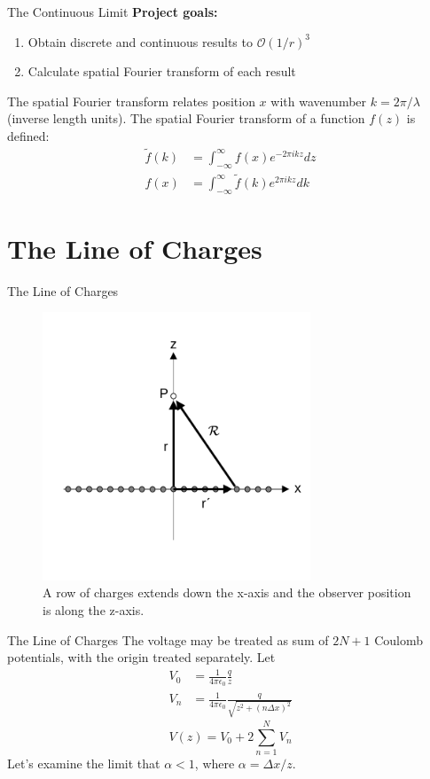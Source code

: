 \documentclass{beamer}
\begin{document}
\begin{frame}{The Continuous Limit}
\alert{\textbf{Project goals:}}
\begin{enumerate}
\item Obtain discrete and continuous results to $\mathcal{O}(1/r)^3$
\item Calculate spatial Fourier transform of each result
\end{enumerate}
The spatial Fourier transform relates position $x$ with wavenumber $k = 2\pi/\lambda$ (inverse length units). The spatial Fourier transform of a function $f(z)$ is defined:
\begin{align}
\widetilde{f}(k) &= \int_{-\infty}^{\infty} f(x) e^{-2\pi i k z} dz \\
f(x) &= \int_{-\infty}^{\infty} \widetilde{f}(k) e^{2\pi i k z} dk
\end{align}
\end{frame}

\section{The Line of Charges}

\begin{frame}{The Line of Charges}
\small
\begin{figure}
\centering
\includegraphics[width=8cm,trim=0cm 3cm 0cm 1cm,clip=true]{figures/line_of_charges.pdf}
\caption{\label{fig:line} A row of charges extends down the x-axis and the observer position is along the z-axis.}
\end{figure}
\end{frame}

\begin{frame}{The Line of Charges}
The voltage may be treated as sum of $2N + 1$ Coulomb potentials, with the origin treated separately.  Let
\begin{align}
V_0 &= \frac{1}{4\pi\epsilon_0} \frac{q}{z} \\
V_n &= \frac{1}{4\pi\epsilon_0} \frac{q}{\sqrt{z^2 + (n\Delta x)^2}}
\end{align}
\begin{equation}
V(z) = V_0 + 2 \sum_{n=1}^{N} V_n
\end{equation}
Let's examine the limit that $\alpha < 1$, where $\alpha = \Delta x / z$.
\end{frame}
\end{document}
